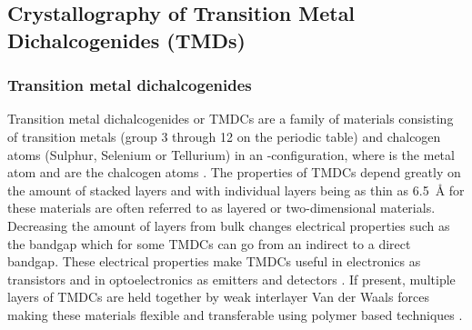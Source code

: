 

\subsection{Crystallography of Transition Metal Dichalcogenides (TMDs)}
\subsubsection{Transition metal dichalcogenides}
Transition metal dichalcogenides or TMDCs are a family of materials consisting of transition metals (group 3 through 12 on the periodic table) and chalcogen atoms (Sulphur, Selenium or Tellurium) in an -configuration, where  is the metal atom and  are the chalcogen atoms \cite{C7TA04268J}.
The properties of TMDCs depend greatly on the amount of stacked layers and with individual layers being as thin as \SI{6.5}{\angstrom} for  these materials are often referred to as layered or two-dimensional materials.
Decreasing the amount of layers from bulk changes electrical properties such as the bandgap which for some TMDCs can go from an indirect to a direct bandgap.
These electrical properties make TMDCs useful in electronics as transistors and in optoelectronics as emitters and detectors \cite{emerg_photolum, LopezSanchez2013, Radisavljevic2011}. 
If present, multiple layers of TMDCs are held together by weak interlayer Van der Waals forces making these materials flexible and transferable using polymer based techniques \cite{reganEmergingExcitonPhysics2022a}.

